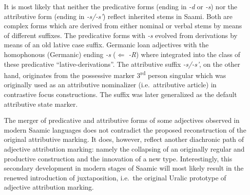 {It is most likely that neither the predicative forms (ending in \textit{-d} or \textit{-s}) nor the attributive form (ending in \textit{-s/-s'}) reflect inherited stems in Saami. Both are complex forms which are derived from either nominal or verbal stems by means of different suffixes. The predicative forms with \textit{-s} evolved from derivations by means of an old lative case suffix. Germanic loan adjectives with the homophonous (Germanic) ending \textit{-s} ($\Leftarrow$  \textit{-R}) where integrated into the class of these predicative “lative-derivations”. The attributive suffix \textit{-s/-s'}, on the other hand, originates from the possessive marker 3\textsuperscript{rd} person singular which was originally used as an attributive nominalizer (i.e.~attributive article) in contrastive focus constructions. The suffix was later generalized as the default attributive state marker.

The merger of predicative and attributive forms of some adjectives observed in modern Saamic languages does not contradict the proposed reconstruction of the original attributive marking. It does, however, reflect another diachronic path of adjective attribution marking: namely the collapsing of an originally regular and productive construction and the innovation of a new type. Interestingly, this secondary development in modern stages of Saamic will most likely result in the renewed introduction of juxtaposition, i.e.~the original Uralic prototype of adjective attribution marking.

}
